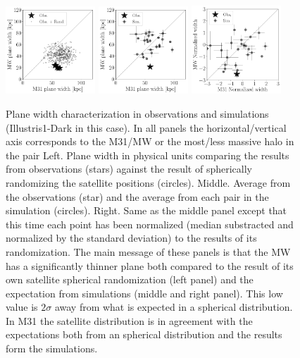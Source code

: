 \documentclass[a4paper,fleqn,usenatbib]{mnras}
\begin{document}
\begin{figure}
\centering
\includegraphics[width=0.30\textwidth]{scatter_random_ranked_width.pdf}
\includegraphics[width=0.30\textwidth]{scatter_ranked_illudm_width.pdf}
\includegraphics[width=0.30\textwidth]{scatter_norm_ranked_illudm_width.pdf}
\caption{Plane width characterization in observations and
  simulations (Illustris1-Dark in this case). In all panels the
  horizontal/vertical axis corresponds to the  M31/MW or the
  most/less massive halo in the pair 
  Left. Plane width in physical units comparing the results from observations
(stars) against the result of spherically randomizing the satellite
positions (circles). 
Middle. Average from the observations (star) and the average from each
pair in the simulation (circles).
Right. Same as the middle panel except that this time each point has
been normalized (median substracted and normalized by the standard
deviation) to the results of its randomization. 
The main message of these panels is that the MW has a significantly
thinner plane both compared to the result of its own satellite
spherical randomization (left panel) and the expectation from
simulations (middle and right panel).  
This low value is $2\sigma$ away from what is expected in a spherical
distribution. 
In M31 the satellite distribution is in agreement with the
expectations both from an spherical distribution and the results form the
simulations. 
\label{fig:scatter_width}}
\end{figure}
\end{document}
